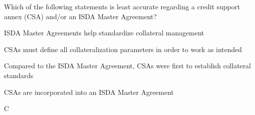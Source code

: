 \documentclass{article}
\newcounter{question} %
\begin{document}
\begin{question}
    Which of the following statements is least accurate regarding a credit support annex (CSA) and/or an ISDA Master Agreement?
\end{question}

\begin{choices}
    \item ISDA Master Agreements help standardize collateral management
    \item CSAs must define all collateralization parameters in order to work as intended
    \item Compared to the ISDA Master Agreement, CSAs were first to establish collateral standards
    \item CSAs are incorporated into an ISDA Master Agreement
\end{choices}

\begin{correctanswer}
    C
\end{correctanswer}
\end{document}
